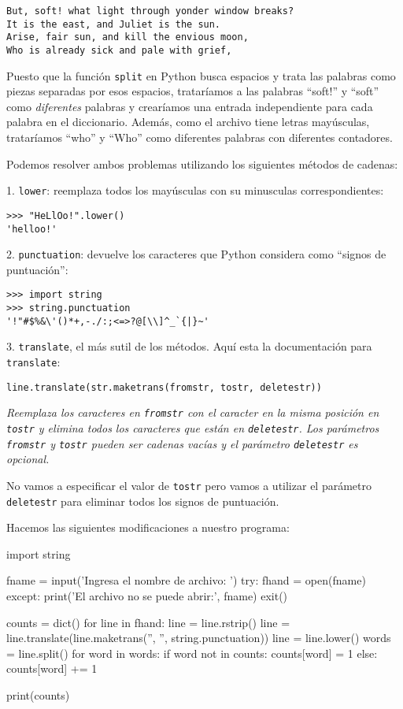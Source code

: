 \begin{verbatim}
But, soft! what light through yonder window breaks?
It is the east, and Juliet is the sun.
Arise, fair sun, and kill the envious moon,
Who is already sick and pale with grief,
\end{verbatim}

Puesto que la función \texttt{split} en Python busca espacios y trata
las palabras como piezas separadas por esos espacios, trataríamos a las
palabras ``soft!'' y ``soft'' como \emph{diferentes} palabras y
crearíamos una entrada independiente para cada palabra en el
diccionario.
Además, como el archivo tiene letras mayúsculas, trataríamos ``who'' y
``Who'' como diferentes palabras con diferentes contadores.

Podemos resolver ambos problemas utilizando los siguientes métodos de cadenas:

1. \texttt{lower}: reemplaza todos los mayúsculas con su minusculas correspondientes:

\begin{Verbatim}[frame=single]
>>> "HeLlOo!".lower()
'helloo!'
\end{Verbatim}

2. \texttt{punctuation}: devuelve los
caracteres que Python considera como ``signos de puntuación'':


\begin{Verbatim}[frame=single]
>>> import string
>>> string.punctuation
'!"#$%&\'()*+,-./:;<=>?@[\\]^_`{|}~'
\end{Verbatim}

3. \texttt{translate}, el más sutil de los métodos. Aquí esta la
documentación para \texttt{translate}:

\texttt{line.translate(str.maketrans(fromstr,\ tostr,\ deletestr))}

\emph{Reemplaza los caracteres en \texttt{fromstr} con el caracter en la
misma posición en \texttt{tostr} y elimina todos los caracteres que
están en \texttt{deletestr}. Los parámetros \texttt{fromstr} y
\texttt{tostr} pueden ser cadenas vacías y el parámetro
\texttt{deletestr} es opcional.}

No vamos a especificar el valor de \texttt{tostr} pero vamos a utilizar
el parámetro \texttt{deletestr} para eliminar todos los signos de
puntuación. 

Hacemos las siguientes modificaciones a nuestro programa:

\begin{python}[frame=single]
import string

fname = input('Ingresa el nombre de archivo: ')
try:
    fhand = open(fname)
except:
    print('El archivo no se puede abrir:', fname)
    exit()

counts = dict()
for line in fhand:
    line = line.rstrip()
    line = line.translate(line.maketrans('', '', string.punctuation))
    line = line.lower()
    words = line.split()
    for word in words:
        if word not in counts:
            counts[word] = 1
        else:
            counts[word] += 1

print(counts)
\end{python}

